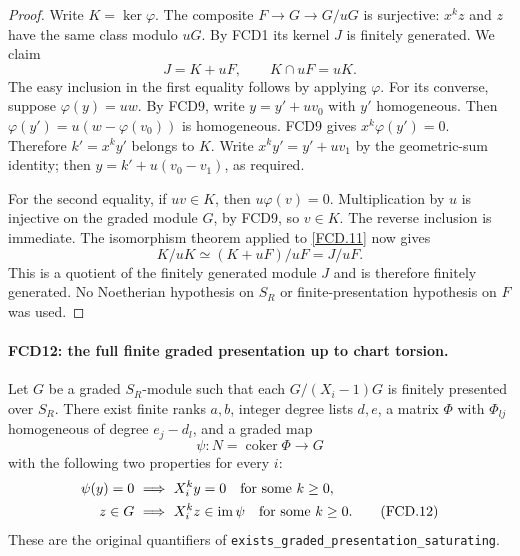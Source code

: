 \begin{proof}
Write $K=\ker\varphi$.  The composite
$F\to G\to G/uG$ is surjective: $x^kz$ and $z$ have the
same class modulo $uG$.  By FCD1 its kernel $J$ is finitely
generated.  We claim
\[
 J=K+uF,\qquad K\cap uF=uK.                          \tag{FCD.11}\label{FCD.11}
\]
The easy inclusion in the first equality follows by applying
$\varphi$.  For its converse, suppose $\varphi(y)=uw$.
By FCD9, write $y=y'+uv_0$ with $y'$ homogeneous.
Then $\varphi(y')=u(w-\varphi(v_0))$ is homogeneous.
FCD9 gives $x^k\varphi(y')=0$.  Therefore $k'=x^ky'$
belongs to $K$.  Write $x^ky'=y'+uv_1$ by the geometric-sum
identity; then $y=k'+u(v_0-v_1)$, as required.

For the second equality, if $uv\in K$, then
$u\varphi(v)=0$.  Multiplication by $u$ is injective on the
graded module $G$, by FCD9, so $v\in K$.  The reverse inclusion
is immediate.  The isomorphism theorem applied to \eqref{FCD.11}
now gives
\[
 K/uK\simeq (K+uF)/uF=J/uF.
\]
This is a quotient of the finitely generated module $J$ and is
therefore finitely generated.  No Noetherian hypothesis on $S_R$
or finite-presentation hypothesis on $F$ was used.
\end{proof}

\paragraph{FCD12: the full finite graded presentation up to chart torsion.}
\label{claim:FCD12}
Let $G$ be a graded $S_R$-module such that each
$G/(X_i-1)G$ is finitely presented over $S_R$.
There exist finite ranks $a,b$, integer degree lists $d,e$, a
matrix $\Phi$ with $\Phi_{lj}$ homogeneous of degree $e_j-d_l$,
and a graded map
\[
 \psi:N=\operatorname{coker}\Phi\longrightarrow G
\]
with the following two properties for every $i$:
\begin{align}
 \psi(y)=0&\ \Longrightarrow\ X_i^ky=0
       \quad\hbox{for some }k\ge0,\nonumber\\
 z\in G&\ \Longrightarrow\ X_i^kz\in\operatorname{im}\psi
       \quad\hbox{for some }k\ge0.                  \tag{FCD.12}\label{FCD.12}
\end{align}
These are the original quantifiers of
\texttt{exists\_\allowbreak{}graded\_\allowbreak{}presentation\_\allowbreak{}saturating}.

